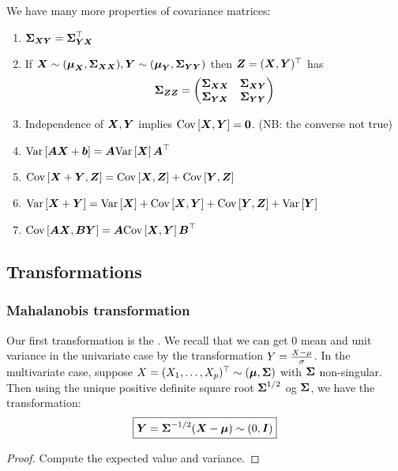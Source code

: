 We have many more properties of covariance matrices:
\begin{enumerate}
    \item $\SS_{\X\Y} = \SS_{\Y\X}^\top$
    \item If $\X\sim(\M_{\X}, \SS_{\X\X}), \Y\sim(\M_{\Y}, \SS_{\Y\Y})$ then $\Z=(\X,\Y)^\top$ has
    $$
        \SS_{\Z\Z} = \begin{pmatrix}
            \SS_{\X\X} & \SS_{\X\Y} \\ \SS_{\Y\X} & \SS_{\Y\Y}
        \end{pmatrix}
    $$
    \item Independence of $\X,\Y$ implies $\cov{\X,\Y}=\zero$. (NB: the converse not true)
    \item $\var{\mA\X+\boldsymbol{b}} = \mA \var{\X}\mA^\top$
    \item $\cov{\X+\Y, \Z} = \cov{\X, \Z} + \cov{\Y, \Z}$
    \item $\var{\X+\Y} = \var{\X} + \cov{\X, \Y} + \cov{\Y, \Z} + \var{\Y}$
    \item $\cov{\mA\X, \mB\Y} = \mA\cov{\X, \Y}\mB^\top$
\end{enumerate}

\subsection{Transformations}
\subsubsection{Mahalanobis transformation}

Our first transformation is the . We recall that we can get 0 mean and unit variance in the univariate case by the transformation $Y=\frac{X-\mu}{\s}$. In the multivariate case, suppose $X=(X_1,\dots, X_p)^\top\sim (\M, \SS)$ with $\SS$ non-singular. Then using the unique positive definite square root $\SS^{1/2}$ og $\SS$, we have the transformation:
\begin{equation}
    \boxed{\Y=\SS^{-1/2}(\X-\M) \sim (0, \mI)}
\end{equation}
\begin{proof}
    Compute the expected value and variance.
\end{proof}

